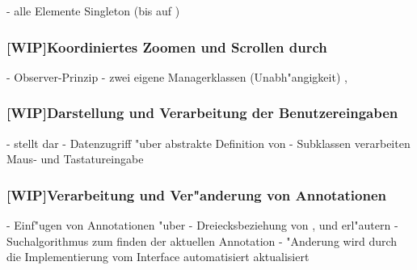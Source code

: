 - alle Elemente Singleton (bis auf )

\subsubsection{[WIP]Koordiniertes Zoomen und Scrollen durch }

- Observer-Prinzip
- zwei eigene Managerklassen (Unabh"angigkeit) , 

\subsubsection{[WIP]Darstellung und Verarbeitung der Benutzereingaben}

-  stellt dar
- Datenzugriff "uber abstrakte Definition von 
- Subklassen verarbeiten Maus- und Tastatureingabe

\subsubsection{[WIP]Verarbeitung und Ver"anderung von Annotationen}

- Einf"ugen von Annotationen "uber 
- Dreiecksbeziehung von ,  und  erl"autern
- Suchalgorithmus zum finden der aktuellen Annotation
- "Anderung wird durch die Implementierung vom Interface  automatisiert aktualisiert

